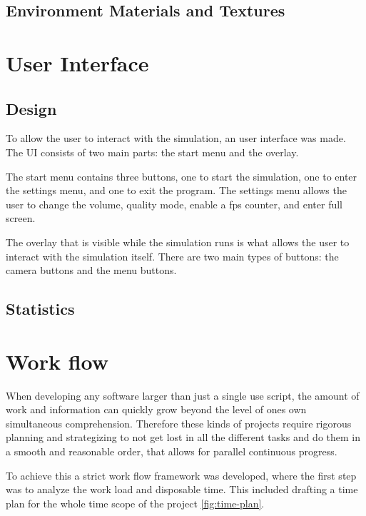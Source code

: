\subsection{Environment Materials and Textures}


\section{User Interface}

\subsection{Design}
    To allow the user to interact with the simulation, an user interface was made. The UI consists of two main parts: the start menu and the overlay. 

    The start menu contains three buttons, one to start the simulation, one to enter the settings menu, and one to exit the program. The settings menu allows the user to change the volume, quality mode, enable a fps counter, and enter full screen. 

    The overlay that is visible while the simulation runs is what allows the user to interact with the simulation itself. There are two main types of buttons: the camera buttons and the menu buttons. %

\subsection{Statistics}


\section{Work flow}
    When developing any software larger than just a single use script, the amount of work and information can quickly grow beyond the level of ones own simultaneous comprehension. Therefore these kinds of projects require rigorous planning and strategizing to not get lost in all the different tasks and do them in a smooth and reasonable order, that allows for parallel continuous progress.

    To achieve this a strict work flow framework was developed, where the first step was to analyze the work load and disposable time. This included drafting a time plan for the whole time scope of the project \ref{fig:time-plan}. 

